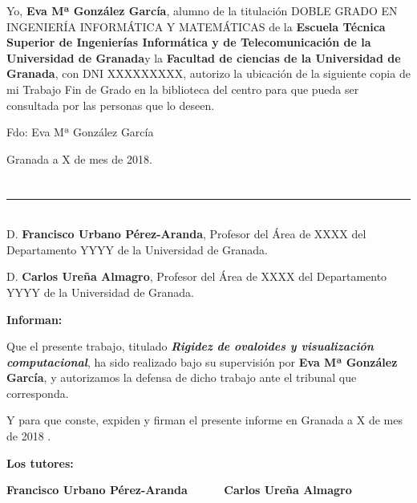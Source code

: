 Yo, \textbf{Eva Mª González García}, alumno de la titulación DOBLE GRADO EN INGENIERÍA INFORMÁTICA Y MATEMÁTICAS de la \textbf{Escuela Técnica Superior
de Ingenierías Informática y de Telecomunicación de la Universidad de Granada}y la \textbf{Facultad de ciencias de la Universidad de Granada}, con DNI XXXXXXXXX, autorizo la
ubicación de la siguiente copia de mi Trabajo Fin de Grado en la biblioteca del centro para que pueda ser
consultada por las personas que lo deseen.

\vspace{6cm}

\noindent Fdo: Eva Mª González García

\vspace{2cm}

\begin{flushright}
Granada a X de mes de 2018.
\end{flushright}


\chapter*{}
\thispagestyle{empty}

\noindent\rule[-1ex]{\textwidth}{2pt}\\[4.5ex]

D. \textbf{Francisco Urbano Pérez-Aranda}, Profesor del Área de XXXX del Departamento YYYY de la Universidad de Granada.

\vspace{0.5cm}

D. \textbf{Carlos Ureña Almagro}, Profesor del Área de XXXX del Departamento YYYY de la Universidad de Granada.


\vspace{0.5cm}

\textbf{Informan:}

\vspace{0.5cm}

Que el presente trabajo, titulado \textit{\textbf{Rigidez de ovaloides y visualización computacional}},
ha sido realizado bajo su supervisión por \textbf{Eva Mª González García}, y autorizamos la defensa de dicho trabajo ante el tribunal que corresponda.

\vspace{0.5cm}

Y para que conste, expiden y firman el presente informe en Granada a X de mes de 2018 .

\vspace{1cm}

\textbf{Los tutores:}

\vspace{5cm}

\noindent \textbf{Francisco Urbano Pérez-Aranda \ \ \ \ \ Carlos Ureña Almagro}





